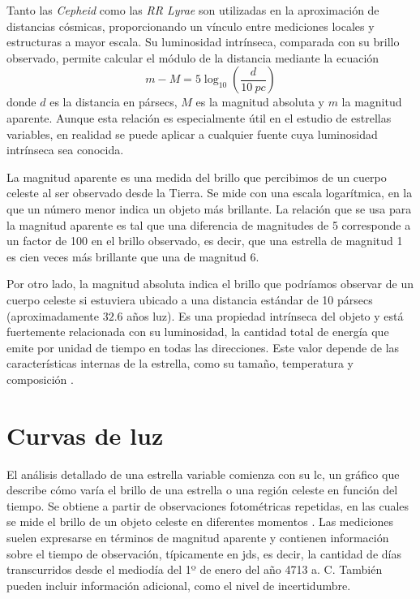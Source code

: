 Tanto las \emph{Cepheid} como las \emph{RR Lyrae} son utilizadas en la aproximación de distancias cósmicas, proporcionando un vínculo entre mediciones locales y estructuras a mayor escala. Su luminosidad intrínseca, comparada con su brillo observado, permite calcular el módulo de la distancia mediante la ecuación
\[
m - M = 5 \log_{10}(\frac{d}{\SI{10}{pc}})
\]
donde $d$ es la distancia en pársecs, $M$ es la magnitud absoluta y $m$ la magnitud aparente. Aunque esta relación es especialmente útil en el estudio de estrellas variables, en realidad se puede aplicar a cualquier fuente cuya luminosidad intrínseca sea conocida.

La magnitud aparente es una medida del brillo que percibimos de un cuerpo celeste al ser observado desde la Tierra. Se mide con una escala logarítmica, en la que un número menor indica un objeto más brillante. La relación que se usa para la magnitud aparente es tal que una diferencia de magnitudes de 5 corresponde a un factor de 100 en el brillo observado, es decir, que una estrella de magnitud 1 es cien veces más brillante que una de magnitud 6.

Por otro lado, la magnitud absoluta indica el brillo que podríamos observar de un cuerpo celeste si estuviera ubicado a una distancia estándar de 10 pársecs (aproximadamente $32.6$ años luz). Es una propiedad intrínseca del objeto y está fuertemente relacionada con su luminosidad, la cantidad total de energía que emite por unidad de tiempo en todas las direcciones. Este valor depende de las características internas de la estrella, como su tamaño, temperatura y composición \citep{caroll2017astrophysics}.

\section{Curvas de luz}

El análisis detallado de una estrella variable comienza con su \acrfull{lc}, un gráfico que describe cómo varía el brillo de una estrella o una región celeste en función del tiempo. Se obtiene a partir de observaciones fotométricas repetidas, en las cuales se mide el brillo de un objeto celeste en diferentes momentos \citep{percy2007variablestars}. Las mediciones suelen expresarse en términos de magnitud aparente y contienen información sobre el tiempo de observación, típicamente en \glspl{jd}, es decir, la cantidad de días transcurridos desde el mediodía del 1º de enero del año 4713 a. C. También pueden incluir información adicional, como el nivel de incertidumbre.

